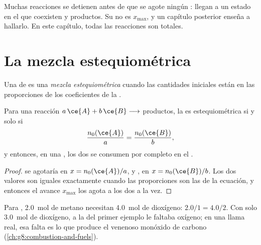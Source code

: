 \begin{remark}\label{rem:g10:reaction-progress-table:not-total}
Muchas reacciones se detienen antes de que se agote ningún :
llegan a un estado en el que coexisten  y productos. Su  no es $x_{\max}$, y un capítulo posterior enseña a hallarlo. En
este capítulo, todas las reacciones son totales.
\end{remark}

\section{La mezcla estequiométrica}

\begin{definition}\label{def:g10:reaction-progress-table:stoichiometric}
Una  de  es una \emph{mezcla
estequiométrica} cuando las cantidades
iniciales están en las proporciones de los coeficientes de la .
\end{definition}

\begin{proposition}\label{prop:g10:reaction-progress-table:together}
Para una reacción $a\,\ce{A} + b\,\ce{B} \longrightarrow$ productos, la  es estequiométrica si
y solo si
\[
  \frac{n_0(\ce{A})}{a} = \frac{n_0(\ce{B})}{b},
\]
y entonces, en una , los dos  se consumen por
completo en el .
\end{proposition}

\begin{proof}
 se agotaría en $x = n_0(\ce{A})/a$, y , en $x = n_0(\ce{B})/b$.
Los dos valores son iguales exactamente cuando las proporciones son las
de la ecuación, y entonces el avance $x_{\max}$ los agota a los dos a la
vez.
\end{proof}

\begin{example}\label{ex:g10:reaction-progress-table:stoich}
Para , \qty{2.0}{mol} de metano necesitan
\qty{4.0}{mol} de dioxígeno: $2.0/1 = 4.0/2$. Con solo \qty{3.0}{mol} de
dioxígeno, a la  del primer ejemplo le faltaba oxígeno; en una
llama real, esa falta es lo que produce el venenoso monóxido de carbono
(\cref{ch:g8:combustion-and-fuels}).
\end{example}

